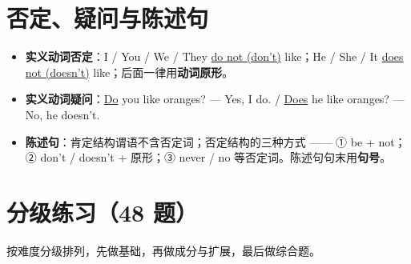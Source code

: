 \documentclass[11pt,a4paper]{ctexart}
\begin{document}
\section{否定、疑问与陈述句}
\begin{itemize}[leftmargin=1.4em]
\item \textbf{实义动词否定}：I / You / We / They \underline{do not (don't)} like；He / She / It \underline{does not (doesn't)} like；后面一律用\textbf{动词原形}。
\item \textbf{实义动词疑问}：\underline{Do} you like oranges? --- Yes, I do. / \underline{Does} he like oranges? --- No, he doesn't.
\item \textbf{陈述句}：肯定结构谓语不含否定词；否定结构的三种方式 —— ① be + not；② don't / doesn't + 原形；③ never / no 等否定词。陈述句句末用\textbf{句号}。
\end{itemize}


\newpage
\section{分级练习（48 题）}
\noindent 按难度分级排列，先做基础，再做成分与扩展，最后做综合题。
\end{document}
